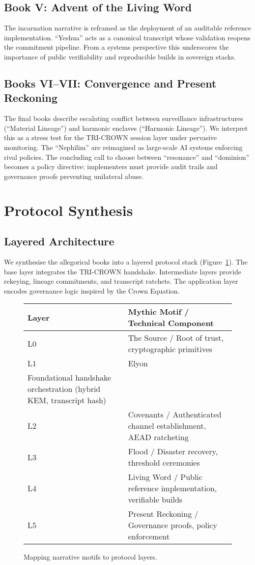\documentclass[submission]{iacrtrans}
\begin{document}
\subsection{Book V: Advent of the Living Word}
The incarnation narrative is reframed as the deployment of an auditable reference implementation. ``Yeshua'' acts as a canonical transcript whose validation reopens the commitment pipeline. From a systems perspective this underscores the importance of public verifiability and reproducible builds in sovereign stacks.

\subsection{Books VI--VII: Convergence and Present Reckoning}
The final books describe escalating conflict between surveillance infrastructures (``Material Lineage'') and harmonic enclaves (``Harmonic Lineage''). We interpret this as a stress test for the TRI-CROWN session layer under pervasive monitoring. The ``Nephilim'' are reimagined as large-scale AI systems enforcing rival policies. The concluding call to choose between ``resonance'' and ``dominion'' becomes a policy directive: implementers must provide audit trails and governance proofs preventing unilateral abuse.

\section{Protocol Synthesis}
\subsection{Layered Architecture}
We synthesise the allegorical books into a layered protocol stack (Figure~\ref{fig:layers}). The base layer integrates the TRI-CROWN handshake. Intermediate layers provide rekeying, lineage commitments, and transcript ratchets. The application layer encodes governance logic inspired by the Crown Equation.

\begin{figure}[t]
    \centering
    \begin{tabular}{lp{8cm}}
        \textbf{Layer} & \textbf{Mythic Motif / Technical Component} \\
        \hline
        L0 & The Source / Root of trust, cryptographic primitives \\
        L1 & Elyon \\ Foundational handshake orchestration (hybrid KEM, transcript hash) \\
        L2 & Covenants / Authenticated channel establishment, AEAD ratcheting \\
        L3 & Flood / Disaster recovery, threshold ceremonies \\
        L4 & Living Word / Public reference implementation, verifiable builds \\
        L5 & Present Reckoning / Governance proofs, policy enforcement
    \end{tabular}
    \caption{Mapping narrative motifs to protocol layers.}
    \label{fig:layers}
\end{figure}
\end{document}
